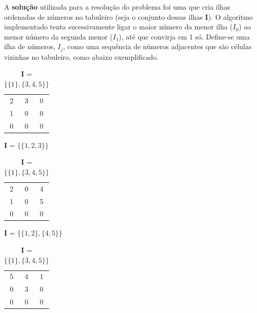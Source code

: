\documentclass[12pt]{exam}
\renewcommand\_{\textunderscore\linebreak[1]}
\begin{document}
        \indent A \textbf{solução} utilizada para a resolução do problema foi uma que cria ilhas ordenadas de números no tabuleiro (seja o conjunto dessas ilhas \textbf{I}). O algoritmo implementado tenta sucessivamente ligar o maior número da menor ilha ($I_{0}$) ao menor número da segunda menor ($I_{1}$), até que convirja em 1 só. Define-se uma ilha de números, $I_{j}$, como uma sequência de números adjacentes que são células vizinhas no tabuleiro, como abaixo exemplificado.
        \vspace{-2.5mm}
        \begin{table}[ht!]\centering\footnotesize
            \begin{subtable}{0.2\textwidth}
                \centering
                \begin{tabular}{ccc}
                    2 & 3 & 0 \\
                    1 & 0 & 0 \\
                    0 & 0 & 0
                \end{tabular}
                \caption{\textbf{I} = $\{\{1, 2, 3\}\}$}
            \end{subtable}
            \hfill
            \begin{subtable}{0.2\textwidth}
                \centering
                \begin{tabular}{ccc}
                    2 & 0 & 4 \\
                    1 & 0 & 5 \\
                    0 & 0 & 0
                \end{tabular}
                \caption{\textbf{I} = $\{\{1, 2\}, \{4, 5\}\}$}
            \end{subtable}
            \hfill
            \begin{subtable}{0.2\textwidth}
                \centering
                \begin{tabular}{ccc}
                    5 & 4 & 1 \\
                    0 & 3 & 0 \\
                    0 & 0 & 0
                \end{tabular}
                \caption{\textbf{I} = $\{\{1\}, \{3, 4, 5\}\}$}
            \end{subtable}
        \end{table}
\end{document}
